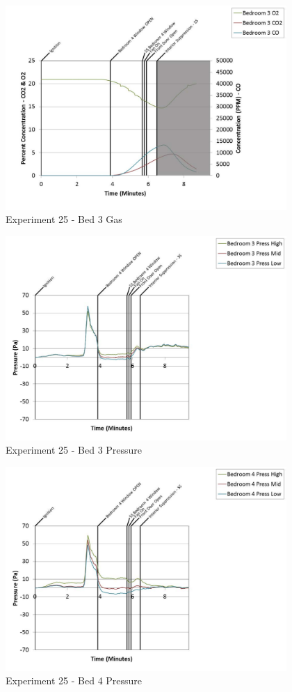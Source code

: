 \documentclass{article}
\begin{document}
\begin{appendices}
	\clearpage

	\begin{figure}[h!]
		\centering
		\includegraphics[height=3.05in]{0_Images/Results_Charts/Exp_25_Charts/Bed3Gas.pdf}
		\caption{Experiment 25 - Bed 3 Gas}
	\end{figure}
 

	\begin{figure}[h!]
		\centering
		\includegraphics[height=3.05in]{0_Images/Results_Charts/Exp_25_Charts/Bed3Pressure.pdf}
		\caption{Experiment 25 - Bed 3 Pressure}
	\end{figure}
 
	\clearpage

	\begin{figure}[h!]
		\centering
		\includegraphics[height=3.05in]{0_Images/Results_Charts/Exp_25_Charts/Bed4Pressure.pdf}
		\caption{Experiment 25 - Bed 4 Pressure}
	\end{figure}
 


\end{appendices}
\end{document}
